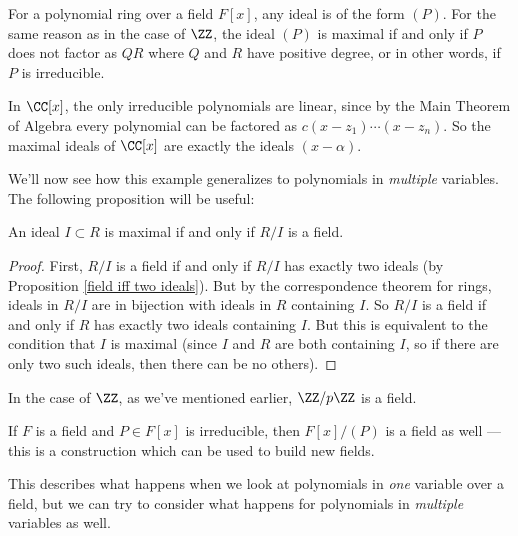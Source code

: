 \begin{example}
For a polynomial ring over a field $F[x]$, any ideal is of the form $(P)$. For the same reason as in the case of $\ZZ$, the ideal $(P)$ is maximal if and only if $P$ does not factor as $QR$ where $Q$ and $R$ have positive degree, or in other words, if $P$ is irreducible. 
\end{example}

\begin{example}
In $\CC[x]$, the only irreducible polynomials are linear, since by the Main Theorem of Algebra every polynomial can be factored as $c(x - z_1)\cdots (x - z_n)$. So the maximal ideals of $\CC[x]$ are exactly the ideals $(x - \alpha)$. 
\end{example}

We'll now see how this example generalizes to polynomials in \emph{multiple} variables. The following proposition will be useful:

\begin{proposition} \label{maximal iff field}
An ideal $I \subset R$ is maximal if and only if $R/I$ is a field.
\end{proposition}

\begin{proof}
First, $R/I$ is a field if and only if $R/I$ has exactly two ideals (by Proposition \ref{field iff two ideals}). But by the correspondence theorem for rings, ideals in $R/I$ are in bijection with ideals in $R$ containing $I$. So $R/I$ is a field if and only if $R$ has exactly two ideals containing $I$. But this is equivalent to the condition that $I$ is maximal (since $I$ and $R$ are both containing $I$, so if there are only two such ideals, then there can be no others).
\end{proof}

\begin{example}
In the case of $\ZZ$, as we've mentioned earlier, $\ZZ/p\ZZ$ is a field.
\end{example}

\begin{example}
If $F$ is a field and $P \in F[x]$ is irreducible, then $F[x]/(P)$ is a field as well --- this is a construction which can be used to build new fields. 
\end{example}

This describes what happens when we look at polynomials in \emph{one} variable over a field, but we can try to consider what happens for polynomials in \emph{multiple} variables as well. 

